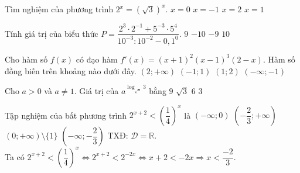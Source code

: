 \begin{ex}%
Tìm nghiệm của phương trình $2^x=\left( \sqrt{3} \right)^x$.	
\choice
{\True $x=0$}
{$x=-1$}
{$x=2$}
{$x=1$}
\end{ex}

\begin{ex}%
Tính giá trị của biểu thức $P=\dfrac{2^3 \cdot 2^{-1}+{5^{-3} \cdot 5^4}}{10^{-3}:10^{-2}-0,1^0}$.
\choice
{$9$}
{\True $-10$}
{$-9$}
{$10$}
\end{ex}

\begin{ex}%
Cho hàm số $f(x)$ có đạo hàm $f'(x)=(x+1)^2(x-1)^3(2-x)$. Hàm số đồng biến trên khoảng nào dưới đây.
\choice
{$(2;+\infty )$}
{$(-1;1)$}
{\True $(1;2)$}
{$(-\infty ;-1)$}


\end{ex}

\begin{ex}%
Cho $a>0$ và $a\ne 1$. Giá trị của $a^{\log _{\sqrt{a}}3}$ bằng
\choice	
{\True $9$}
{$\sqrt{3}$ }
{$6$}
{$3$}
\end{ex}

\begin{ex}%
Tập nghiệm của bất phương trình $2^{x+2}<\left( \dfrac{1}{4} \right)^x$ là
\choice
{$(-\infty ;0)$}
{$\left( -\dfrac{2}{3};+\infty  \right)$}
{$(0;+\infty) \setminus \{ 1 \}$}
{\True $\left( -\infty ;-\dfrac{2}{3} \right)$}
\loigiai
{
TXĐ: $\mathscr{D} = \mathbb{R}.$\\
Ta có  $2^{x+2}<\left( \dfrac{1}{4} \right)^x \Leftrightarrow 2^{x+2}<2^{-2x} \Leftrightarrow x+2<-2x \Rightarrow x<\dfrac{-2}{3}$.
}
\end{ex}

